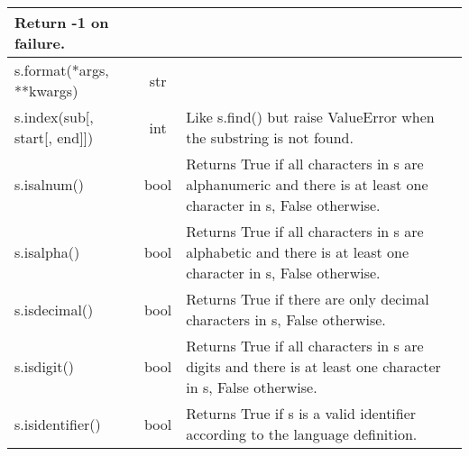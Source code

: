 \begin{center}
{\begin{tabular}{|l|c|p{2.2in}|}
       Return -1 on failure.   
\\ \hline
       s.format(*args, **kwargs) & str
&   
\\ \hline
       s.index(sub[, start[, end]]) & int
 &      
       Like s.find() but raise ValueError when the substring is not found.
\\ \hline
       s.isalnum() & bool
 &     
       Returns True if all characters in s are alphanumeric
       and there is at least one character in s, False otherwise.
\\ \hline
       s.isalpha() & bool
&    
       Returns True if all characters in s are alphabetic
       and there is at least one character in s, False otherwise.
\\ \hline
       s.isdecimal() & bool
 &    
       Returns True if there are only decimal characters in s,
       False otherwise.   
\\ \hline
       s.isdigit() & bool
&     
       Returns True if all characters in s are digits
       and there is at least one character in s, False otherwise.  
\\ \hline
       s.isidentifier() & bool
&     
       Returns True if s is a valid identifier according
       to the language definition. 
\\ \hline
\end{tabular}}
\end{center}


